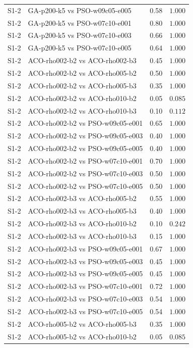 \begin{tabular}{llrr}
S1-2 & GA-p200-k5 vs PSO-w09c05-e005 & 0.58 & $1.000$ \\
S1-2 & GA-p200-k5 vs PSO-w07c10-e001 & 0.80 & $1.000$ \\
S1-2 & GA-p200-k5 vs PSO-w07c10-e003 & 0.66 & $1.000$ \\
S1-2 & GA-p200-k5 vs PSO-w07c10-e005 & 0.64 & $1.000$ \\
S1-2 & ACO-rho002-b2 vs ACO-rho002-b3 & 0.45 & $1.000$ \\
S1-2 & ACO-rho002-b2 vs ACO-rho005-b2 & 0.50 & $1.000$ \\
S1-2 & ACO-rho002-b2 vs ACO-rho005-b3 & 0.35 & $1.000$ \\
S1-2 & ACO-rho002-b2 vs ACO-rho010-b2 & 0.05 & $0.085$ \\
S1-2 & ACO-rho002-b2 vs ACO-rho010-b3 & 0.10 & $0.112$ \\
S1-2 & ACO-rho002-b2 vs PSO-w09c05-e001 & 0.65 & $1.000$ \\
S1-2 & ACO-rho002-b2 vs PSO-w09c05-e003 & 0.40 & $1.000$ \\
S1-2 & ACO-rho002-b2 vs PSO-w09c05-e005 & 0.40 & $1.000$ \\
S1-2 & ACO-rho002-b2 vs PSO-w07c10-e001 & 0.70 & $1.000$ \\
S1-2 & ACO-rho002-b2 vs PSO-w07c10-e003 & 0.50 & $1.000$ \\
S1-2 & ACO-rho002-b2 vs PSO-w07c10-e005 & 0.50 & $1.000$ \\
S1-2 & ACO-rho002-b3 vs ACO-rho005-b2 & 0.55 & $1.000$ \\
S1-2 & ACO-rho002-b3 vs ACO-rho005-b3 & 0.40 & $1.000$ \\
S1-2 & ACO-rho002-b3 vs ACO-rho010-b2 & 0.10 & $0.242$ \\
S1-2 & ACO-rho002-b3 vs ACO-rho010-b3 & 0.15 & $1.000$ \\
S1-2 & ACO-rho002-b3 vs PSO-w09c05-e001 & 0.67 & $1.000$ \\
S1-2 & ACO-rho002-b3 vs PSO-w09c05-e003 & 0.45 & $1.000$ \\
S1-2 & ACO-rho002-b3 vs PSO-w09c05-e005 & 0.45 & $1.000$ \\
S1-2 & ACO-rho002-b3 vs PSO-w07c10-e001 & 0.72 & $1.000$ \\
S1-2 & ACO-rho002-b3 vs PSO-w07c10-e003 & 0.54 & $1.000$ \\
S1-2 & ACO-rho002-b3 vs PSO-w07c10-e005 & 0.54 & $1.000$ \\
S1-2 & ACO-rho005-b2 vs ACO-rho005-b3 & 0.35 & $1.000$ \\
S1-2 & ACO-rho005-b2 vs ACO-rho010-b2 & 0.05 & $0.085$ \\

\end{tabular}
